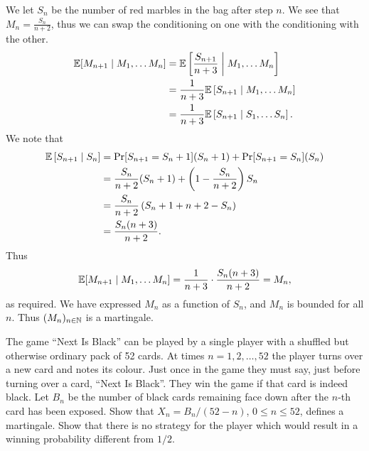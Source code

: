 \begin{solution}
    We let $S_n$ be the number of red marbles in the bag after step $n$. We see that $M_n = \frac{S_n}{n+2}$, thus we can swap the conditioning on one with the conditioning with the other.
    \begin{align*}
        \mathbb E[M_{n+1} \mid M_1, \ldots M_n] & = \mathbb E\left[\frac{S_{n+1}}{n+3} \;\middle|\; M_1, \ldots M_n\right] \\
                                         & = \frac{1}{n+3}\mathbb E\left[S_{n+1}\mid M_1, \ldots M_n\right]         \\
                                         & = \frac{1}{n+3}\mathbb E\left[S_{n+1}\mid S_1, \ldots S_n\right].
    \end{align*}
    We note that
    \begin{align*}
        \mathbb E\left[S_{n+1}\mid S_n\right] & = \Pr[S_{n+1} = S_n + 1](S_n + 1) + \Pr[S_{n+1} = S_n](S_n)          \\
                                       & = \frac{S_n}{n + 2}(S_n + 1) + \left(1 - \frac{S_n}{n + 2}\right)S_n \\
                                       & = \frac{S_n}{n+2} \left(S_n + 1 + n + 2 - S_n \right)                \\
                                       & = \frac{S_n(n+3)}{n+2}.
    \end{align*}
    Thus
    \[ \mathbb E[M_{n+1} \mid M_1, \ldots M_n] = \frac{1}{n+3} \cdot \frac{S_n(n+3)}{n+2} = M_n, \]
    as required. We have expressed $M_n$ as a function of $S_n$, and $M_n$ is bounded for all $n$. Thus $(M_n)_{n \in \mathbb N}$ is a martingale.
\end{solution}

\question The game ``Next Is Black'' can be played by a single player with a shuffled but otherwise ordinary pack of 52 cards. At times $n = 1, 2, \ldots, 52$ the player turns over a new card and notes its colour. Just once in the game they must say, just before turning over a card, ``Next Is Black''. They win the game if that card is indeed black. Let $B_n$ be the number of black cards remaining face down after the $n$-th card has been exposed. Show that $X_n = B_n/(52-n)$, $0 \leq n \leq 52$, defines a martingale. Show that there is no strategy for the player which would result in a winning probability different from $1/2$.

